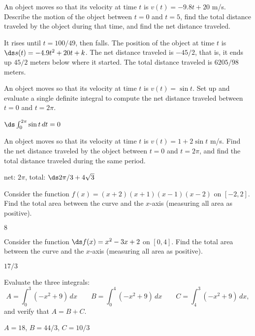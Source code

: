 \begin{exercises}

\exercise An object moves so that its velocity at time $t$ is
$v(t)=-9.8t+20$ m/s. Describe the motion of the object between $t=0$ and
$t=5$, find the total distance traveled by the object during that
time, and find the net distance traveled.
\begin{answer} It rises until $t=100/49$, then falls. The position of the
object at time $t$ is $\ds s(t)=-4.9t^2+20t+k$. The net distance traveled
is $-45/2$, that is, it ends up $45/2$ meters below where it started.
The total distance traveled is $6205/98$ meters. 
\end{answer}

\exercise An object moves so that its velocity at time $t$ is $v(t)=\sin t$.
Set up and evaluate a single definite integral to compute the
net distance traveled between $t=0$ and $t=2\pi$.
\begin{answer} $\ds\int_0^{2\pi}\sin t\,dt=0$
\end{answer}

\exercise An object moves so that its velocity at time $t$ is
$v(t)=1+2\sin t$ m/s. Find the net distance traveled by the object
between $t=0$ and $t=2\pi$, and find the total distance traveled
during the same period.
\begin{answer} net: $2\pi$, total: $\ds 2\pi/3+4\sqrt3$ 
\end{answer}

\exercise Consider the function $f(x)=(x+2)(x+1)(x-1)(x-2)$ on
$[-2,2]$. Find the total area between the curve and the $x$-axis
(measuring all area as positive).
\begin{answer} $8$
\end{answer}

\exercise Consider the function $\ds f(x)=x^2-3x+2$ on
$[0,4]$. Find the total area between the curve and the $x$-axis
(measuring all area as positive).
\begin{answer} $17/3$
\end{answer}

\exercise Evaluate the three integrals:
$$
  A=\int_0^3 (-x^2+9)\,dx\qquad B=\int_0^{4} (-x^2+9)\,dx\qquad 
  C=\int_{4}^3 (-x^2+9)\,dx,
$$
and verify that $A=B+C$.
\begin{answer} $A=18$, $B=44/3$, $C=10/3$
\end{answer}

\end{exercises}

